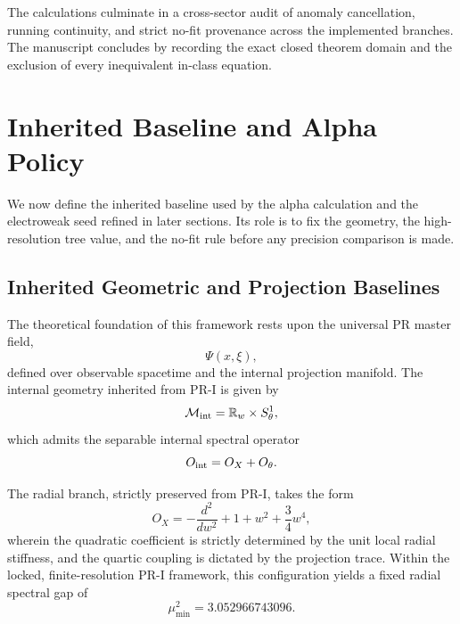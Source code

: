 \documentclass[11pt]{article}
\begin{document}
The calculations culminate in a cross-sector audit of anomaly cancellation,
running continuity, and strict no-fit provenance across the implemented
branches.  The manuscript concludes by recording the exact closed theorem
domain and the exclusion of every inequivalent in-class equation.

\section{Inherited Baseline and Alpha Policy}
\label{sec:priii-inheritance-baseline}

We now define the inherited baseline used by the alpha calculation and the electroweak seed refined in later sections.  Its role is to fix the geometry, the high-resolution tree value, and the no-fit rule before any precision comparison is made.

\subsection{Inherited Geometric and Projection Baselines}
\label{subsec:priii-frozen-projection-data}

The theoretical foundation of this framework rests upon the universal PR master field,
\begin{equation}
\Psi(x,\xi),
\end{equation}
defined over observable spacetime and the internal projection manifold. The internal geometry inherited from PR-I is given by
\begin{equation}
\mathcal M_{\rm int}=\mathbb R_w\times S^1_\theta,
\end{equation}
which admits the separable internal spectral operator
\begin{equation}
O_{\rm int}=O_X+O_\theta .
\end{equation}

The radial branch, strictly preserved from PR-I, takes the form
\begin{equation}
O_X=-\frac{d^2}{dw^2}+1+w^2+\frac34 w^4,
\label{eq:priii-radial-operator}
\end{equation}
wherein the quadratic coefficient is strictly determined by the unit local radial stiffness, and the quartic coupling is dictated by the projection trace. Within the locked, finite-resolution PR-I framework, this configuration yields a fixed radial spectral gap of
\begin{equation}
\mu_{\min}^2=3.052966743096.
\end{equation}
\end{document}
